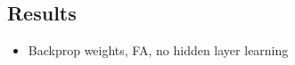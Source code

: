 \subsection{Results}
\begin{itemize}
	\item Backprop weights, FA, no hidden layer learning
\end{itemize}